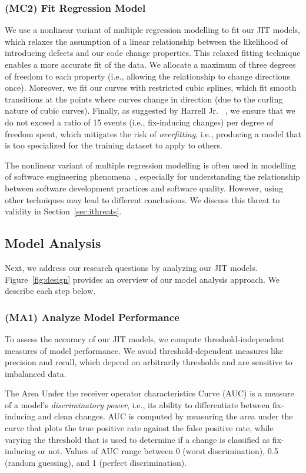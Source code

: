 \subsubsection*{(MC2) Fit Regression Model}
We use a nonlinear variant of multiple regression modelling to fit our JIT models, which relaxes the assumption of a linear relationship between the likelihood of introducing defects and our code change properties.
This relaxed fitting technique enables a more accurate fit of the data. 
We allocate a maximum of three degrees of freedom to each property (i.e., allowing the relationship to change directions once).
Moreover, we fit our curves with restricted cubic splines, which fit smooth transitions at the points where curves change in direction (due to the curling nature of cubic curves).
Finally, as suggested by Harrell Jr. \ea~\cite{budget1, budget2}, we ensure that we do not exceed a ratio of 15 events (i.e., fix-inducing changes) per degree of freedom spent, which mitigates the risk of {\em overfitting}, i.e., producing a model that is too specialized for the training dataset to apply to others. 

The nonlinear variant of multiple regression modelling is often used in modelling of software engineering phenomena~\cite{mcintosh2016emse,morales2015saner,zhou2011icse}, especially for understanding the relationship between software development practices and software quality.
However, using other techniques may lead to different conclusions.
We discuss this threat to validity in Section~\ref{sec:ithreats}.

\subsection{Model Analysis}
\label{sec:ma}

Next, we address our research questions by analyzing our JIT models.
Figure~\ref{fig:design} provides an overview of our model analysis approach.
We describe each step below.

\subsubsection*{(MA1) Analyze Model Performance}
To assess the accuracy of our JIT models, we compute threshold-independent measures of model performance.
We avoid threshold-dependent measures like precision and recall, which depend on arbitrarily thresholds and are sensitive to imbalanced data.

The Area Under the receiver operator characteristics Curve (AUC) is a measure of a model's {\em discriminatory power}, i.e., its ability to differentiate between fix-inducing and clean changes.
AUC is computed by measuring the area under the curve that plots the true positive rate against the false positive rate, while varying the threshold that is used to determine if a change is classified as fix-inducing or not.
Values of AUC range between 0 (worst discrimination), 0.5 (random guessing), and 1 (perfect discrimination).

